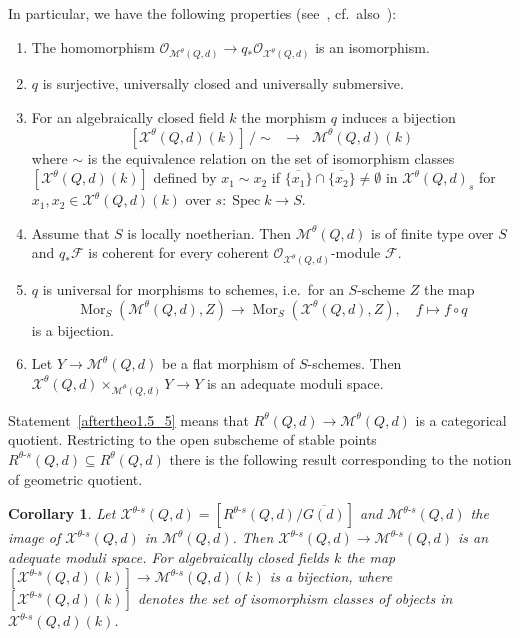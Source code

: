 \documentclass[10pt,a4paper]{amsart}
\newcommand{\ie}{i.e.\ }
\newcommand{\cf}{cf.\ }
\newtheorem{coro}[theo]{Corollary}
\theoremstyle{definition}
\def\O{\mathcal O}
\DeclareMathOperator{\Mor}{Mor}
\DeclareMathOperator{\Spec}{Spec}
\begin{document}
In particular, we have the following properties (see~\cite{Al14}, \cf also~\cite{Ses77}):
\begin{enumerate}[label=(\arabic*)]
\item\label{aftertheo1.5_1} The homomorphism $\O_{\mathcal M^\theta(Q,d)}\to q_*\O_{\mathcal X^\theta(Q,d)}$
is an isomorphism.
\item\label{aftertheo1.5_2} $q$ is surjective, universally closed and universally submersive.
\item\label{aftertheo1.5_3} For an algebraically closed field $k$ the morphism $q$ induces a bijection
\[
[\mathcal X^\theta(Q,d)(k)]\,/\!\sim\;\;\to\;\;\mathcal M^\theta(Q,d)(k)
\]
where $\sim$ is the equivalence relation on the set of isomorphism classes
$[\mathcal X^\theta(Q,d)(k)]$ defined by $x_1\sim x_2$ if 
$\overline{\{x_1\}}\cap\overline{\{x_2\}}\neq\emptyset$ 
in $\mathcal X^\theta(Q,d)_s$ for $x_1,x_2\in\mathcal X^\theta(Q,d)(k)$ 
over $s\colon\Spec k\to S$.
\item\label{aftertheo1.5_4} Assume that $S$ is locally noetherian. Then $\mathcal M^\theta(Q,d)$ is of 
finite type over $S$ and $q_*\mathscr F$ is coherent for every coherent 
$\O_{\mathcal X^\theta(Q,d)}$-module $\mathscr F$.
\item\label{aftertheo1.5_5} $q$ is universal for morphisms to schemes, \ie for an $S$-scheme $Z$ 
the map
\[
\Mor_S(\mathcal M^\theta(Q,d),Z)\to\Mor_S(\mathcal X^\theta(Q,d),Z),
\quad f\mapsto f\circ q
\]
is a bijection.
\item\label{aftertheo1.5_6} Let $Y\to\mathcal M^\theta(Q,d)$ be a flat morphism of $S$-schemes.
Then $\mathcal X^\theta(Q,d)\times_{\mathcal M^\theta(Q,d)}Y\to Y$
is an adequate moduli space.
\end{enumerate}

Statement~\ref{aftertheo1.5_5} means that $R^\theta(Q,d)\to\mathcal M^\theta(Q,d)$ is a 
categorical quotient. Restricting to the open subscheme of stable points 
$R^{\theta\text{-}s}(Q,d)\subseteq R^\theta(Q,d)$ there is the following 
result corresponding to the notion of geometric quotient.

\begin{coro} 
Let $\mathcal X^{\theta\text{-}s}(Q,d)\!=\![R^{\theta\text{-}s}(Q,d)/\overline{G(d)}]$
and $\mathcal M^{\theta\text{-}s}(Q,d)$ the image of
$\mathcal X^{\theta\text{-}s}(Q,d)$ in $\mathcal M^\theta(Q,d)$. 
Then $\mathcal X^{\theta\text{-}s}(Q,d)\to\mathcal M^{\theta\text{-}s}(Q,d)$
is an adequate moduli space. For algebraically closed fields $k$ the map 
$[\mathcal X^{\theta\text{-}s}(Q,d)(k)]\to\mathcal M^{\theta\text{-}s}(Q,d)(k)$ 
is a bijection, where $[\mathcal X^{\theta\text{-}s}(Q,d)(k)]$ denotes the set of 
isomorphism classes of objects in $\mathcal X^{\theta\text{-}s}(Q,d)(k)$. 
\end{coro}
\end{document}
